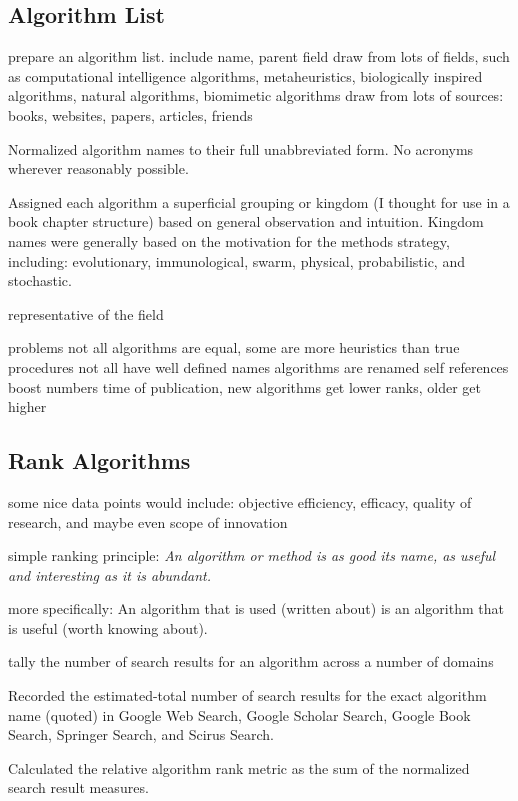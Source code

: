 \documentclass[a4paper, 11pt]{article}
\begin{document}
% 
% 
\subsection{Algorithm List}
prepare an algorithm list. include name, parent field
draw from lots of fields, such as computational intelligence algorithms, metaheuristics, biologically inspired algorithms, natural algorithms, biomimetic algorithms
draw from lots of sources: books, websites, papers, articles, friends


Normalized algorithm names to their full unabbreviated form. No acronyms wherever reasonably possible.

Assigned each algorithm a superficial grouping or kingdom (I thought for use in a book chapter structure) based on general observation and intuition. Kingdom names were generally based on the motivation for the methods strategy, including: evolutionary, immunological, swarm, physical, probabilistic, and stochastic.

representative of the field

problems
not all algorithms are equal, some are more heuristics than true procedures
not all have well defined names
algorithms are renamed
self references boost numbers
time of publication, new algorithms get lower ranks, older get higher

% 
% 
\subsection{Rank Algorithms}
some nice data points would include: objective efficiency, efficacy, quality of research, and maybe even scope of innovation

simple ranking principle: \emph{An algorithm or method is as good its name, as useful and interesting as it is abundant.}

more specifically: An algorithm that is used (written about) is an algorithm that is useful (worth knowing about).

tally the number of search results for an algorithm across a number of domains

Recorded the estimated-total number of search results for the exact algorithm name (quoted) in Google Web Search, Google Scholar Search, Google Book Search, Springer Search, and Scirus Search.

Calculated the relative algorithm rank metric as the sum of the normalized search result measures.

% 
% 
\end{document}
